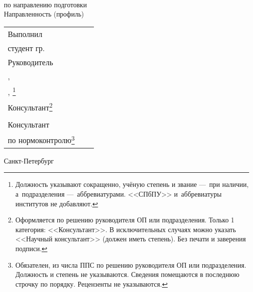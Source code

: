 \vspace{0pt plus2fill} %


{\centering%
	
	\MakeUppercase{\bfseries{}\DocType} \\ 
	\MakeUppercase{\normalfont{}\thesisDegree}%


{\centering%
	\MakeUppercase{\bfseries{\thesisTitle}}}%

}\par%

\noindent	по направлению подготовки \thesisSpecialtyCodeAndTitle{}\\%
\noindent	Направленность (профиль)	\thesisOPCodeAndTitle %
\par%





\vspace{4mm plus2fill}%

\noindent
\begin{tabularx}{\linewidth}{lXl}
	Выполнил              &	   &             \\
	студент гр.~\group     &    & \Author     \\[\mfloatsep]

	Руководитель 		  &    &             \\
	\SupervisorJob,		  &    &             \\
	\SupervisorDegree, \SupervisorTitle\footnote{Должность указывают сокращенно, учёную степень и звание ---~при наличии, а~подразделения ---~аббревиатурами. <<СПбПУ>> и~аббревиатуры институтов не добавляют.} 	  &    & \Supervisor \\[\mfloatsep]
	
	Консультант\footnote{Оформляется по решению руководителя ОП или подразделения. Только 1 категория: <<Консультант>>. В исключительных случаях можно указать <<Научный консультант>> (должен иметь степень). Без печати и заверения подписи.}		  &    & 			 \\
	\ConsultantExtraDegree 	  &    & \ConsultantExtra\\[\mfloatsep]
	
	Консультант  &    &  \\   	
	по нормоконтролю\footnote{Обязателен, из числа ППС по решению руководителя ОП или подразделения. Должность и степень не указываются. Сведения помещаются в последнюю строчку по порядку. Рецензенты не указываются.}  		 	  &    & \ConsultantNorm  %
\end{tabularx} %


%
\vspace{0pt plus4fill}%


\begin{center}%
Санкт-Петербург \\
\thesisYear
\end{center}%
\restoregeometry
\newpage